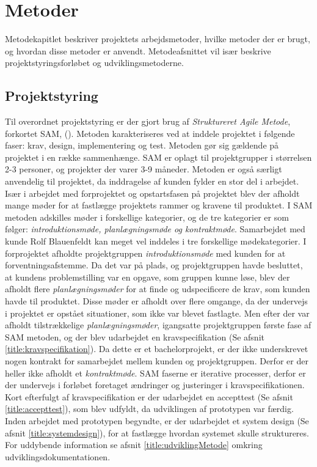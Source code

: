 \chapter{Metoder}
Metodekapitlet beskriver projektets arbejdsmetoder, hvilke metoder der er brugt, og hvordan disse metoder er anvendt. Metodeafsnittet vil især beskrive projektstyringsforløbet og udviklingsmetoderne. 

\section{Projektstyring} \label{title:projektstyring}
Til overordnet projektstyring er der gjort brug af \textit{Struktureret Agile Metode}, forkortet SAM, (\cite{RefWorks:35}). Metoden karakteriseres ved at inddele projektet i følgende faser: krav, design, implementering og test. Metoden gør sig gældende på projektet i en række sammenhænge. SAM er oplagt til projektgrupper i størrelsen 2-3 personer, og projekter der varer 3-9 måneder. Metoden er også særligt anvendelig til projektet, da inddragelse af kunden fylder en stor del i arbejdet. 
Især i arbejdet med forprojektet og opstartsfasen på projektet blev der afholdt mange møder for at fastlægge projektets rammer og kravene til produktet. I SAM metoden adskilles møder i forskellige kategorier, og de tre kategorier er som følger: \textit{introduktionsmøde, planlægningsmøde og kontraktmøde}. Samarbejdet med kunde Rolf Blauenfeldt kan meget vel inddeles i tre forskellige mødekategorier. I forprojektet afholdte projektgruppen \textit{introduktionsmøde} med kunden for at forventningsafstemme. Da det var på plads, og projektgruppen havde besluttet, at kundens problemstilling var en opgave, som gruppen kunne løse, blev der afholdt flere \textit{planlægningsmøder} for at finde og udspecificere de krav, som kunden havde til produktet. Disse møder er afholdt over flere omgange, da der undervejs i projektet er opstået situationer, som ikke var blevet fastlagte. Men efter der var afholdt tilstrækkelige \textit{planlægningsmøder}, igangsatte projektgruppen første fase af SAM metoden, og der blev udarbejdet en kravspecifikation (Se afsnit \ref{title:kravspecifikation}). Da dette er et bachelorprojekt, er der ikke underskrevet nogen kontrakt for samarbejdet mellem kunden og projektgruppen. Derfor er der heller ikke afholdt et \textit{kontraktmøde}. SAM faserne er iterative processer, derfor er der undervejs i forløbet  foretaget ændringer og justeringer i kravspecifikationen. Kort efterfulgt af kravspecifikation er der udarbejdet en accepttest (Se afsnit \ref{title:accepttest}), som blev udfyldt, da udviklingen af prototypen var færdig. Inden arbejdet med prototypen begyndte, er der udarbejdet et system design (Se afsnit \ref{title:systemdesign}), for at fastlægge hvordan systemet skulle struktureres. For uddybende information se afsnit \ref{title:udviklingMetode} omkring udviklingsdokumentationen.

